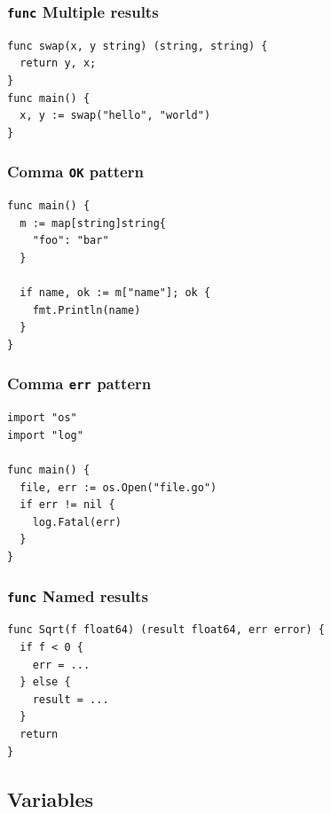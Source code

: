 \documentclass[xetex,mathserif,serif,12pt]{beamer}
\begin{document}
\begin{frame}[fragile]
  \frametitle{\texttt{func} Multiple results}

  \begin{beamer@nomargin}
    \begin{lstlisting}
func swap(x, y string) (string, string) {
  return y, x;
}
func main() {
  x, y := swap("hello", "world")
}
    \end{lstlisting}
  \end{beamer@nomargin}
\end{frame}

\begin{frame}[fragile]
  \frametitle{Comma \texttt{OK} pattern}

  \begin{beamer@nomargin}
    \begin{lstlisting}
func main() {
  m := map[string]string{
    "foo": "bar"
  }

  if name, ok := m["name"]; ok {
    fmt.Println(name)  
  }
}
    \end{lstlisting}
  \end{beamer@nomargin}
\end{frame}

\begin{frame}[fragile]
  \frametitle{Comma \texttt{err} pattern}

  \begin{beamer@nomargin}
    \begin{lstlisting}
import "os"
import "log"

func main() {
  file, err := os.Open("file.go")
  if err != nil {
    log.Fatal(err)
  }
}
    \end{lstlisting}
  \end{beamer@nomargin}
\end{frame}


\begin{frame}[fragile]
  \frametitle{\texttt{func} Named results}

  \begin{beamer@nomargin}
    \begin{lstlisting}
func Sqrt(f float64) (result float64, err error) {
  if f < 0 {
    err = ...
  } else {
    result = ...
  }
  return
}
    \end{lstlisting}
  \end{beamer@nomargin}
\end{frame}

\subsection{Variables}
\end{document}
